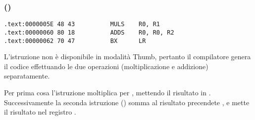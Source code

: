 \subsubsection{\OptimizingKeilVI (\ThumbMode)}

\begin{lstlisting}[label=ARM_leaf_example2,style=customasmARM]
.text:0000005E 48 43          MULS    R0, R1
.text:00000060 80 18          ADDS    R0, R0, R2
.text:00000062 70 47          BX      LR
\end{lstlisting}

L'istruzione  non è disponibile in modalità Thumb, pertanto il compilatore genera il codice effettuando le due operazioni 
(moltiplicazione e addizione) separatamente.

Per prima cosa l'istruzione  moltiplica  per , mettendo il risultato in .
Successivamente la seconda istruzione () somma al risultato precendete , e mette il risultato nel registro .

